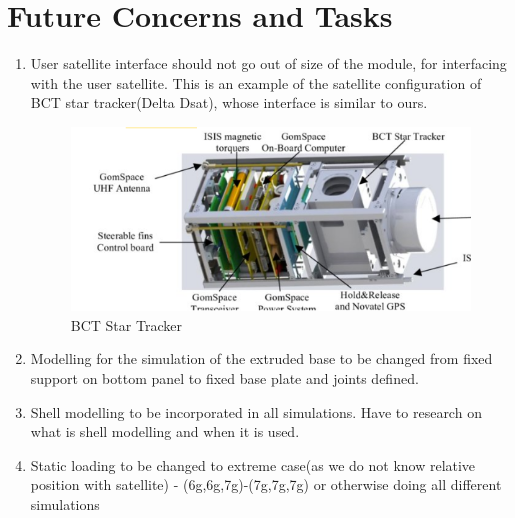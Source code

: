 \documentclass[../../main.tex]{subfiles}
\begin{document}
\section{Future Concerns and Tasks} 
\begin{enumerate}
    \item User satellite interface should not go out of size of the module, for interfacing with the user satellite. This is an example of the satellite configuration of BCT star tracker(Delta Dsat), whose interface is similar to ours.
    \begin{figure}[H]
        \centering
        \includegraphics[scale=0.75]{Figures/Mechanical/example.png}
        \caption{BCT Star Tracker}
        \label{fig:sys_CAD}
    \end{figure}
    \item Modelling for the simulation of the extruded base to be changed from fixed support on bottom panel to fixed base plate and joints defined.
    \item Shell modelling to be incorporated in all simulations. Have to research on what is shell modelling and when it is used.
    \item Static loading to be changed to extreme case(as we do not know relative position with satellite) - (6g,6g,7g)-(7g,7g,7g) or otherwise doing all different simulations



\end{enumerate}

\end{document}
